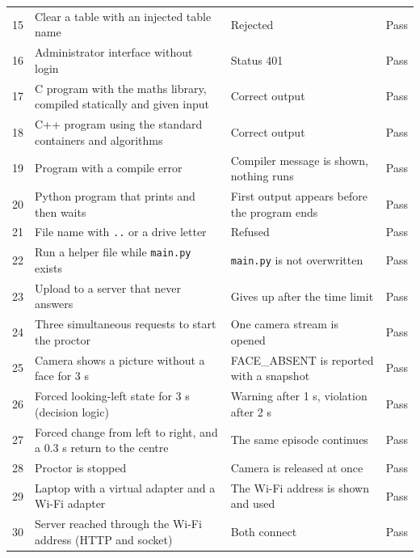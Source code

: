 \documentclass[12pt,a4paper]{report}
\begin{document}
{\begin{longtable}{@{}C{0.8cm} L{5.5cm} L{4.2cm} C{1.1cm}@{}}
15 & Clear a table with an injected table name & Rejected & Pass\\
16 & Administrator interface without login & Status 401 & Pass\\
17 & C program with the maths library, compiled statically and given input & Correct output & Pass\\
18 & C++ program using the standard containers and algorithms & Correct output & Pass\\
19 & Program with a compile error & Compiler message is shown, nothing runs & Pass\\
20 & Python program that prints and then waits & First output appears before the program ends & Pass\\
21 & File name with \texttt{..} or a drive letter & Refused & Pass\\
22 & Run a helper file while \texttt{main.py} exists & \texttt{main.py} is not overwritten & Pass\\
23 & Upload to a server that never answers & Gives up after the time limit & Pass\\
24 & Three simultaneous requests to start the proctor & One camera stream is opened & Pass\\
25 & Camera shows a picture without a face for 3 s & FACE\_ABSENT is reported with a snapshot & Pass\\
26 & Forced looking-left state for 3 s (decision logic) & Warning after 1 s, violation after 2 s & Pass\\
27 & Forced change from left to right, and a 0.3 s return to the centre & The same episode continues & Pass\\
28 & Proctor is stopped & Camera is released at once & Pass\\
29 & Laptop with a virtual adapter and a Wi-Fi adapter & The Wi-Fi address is shown and used & Pass\\
30 & Server reached through the Wi-Fi address (HTTP and socket) & Both connect & Pass\\
\bottomrule
\end{longtable}}
\end{document}
